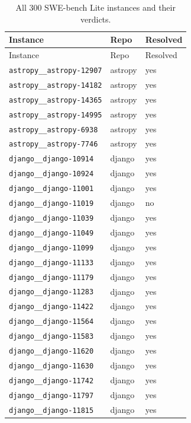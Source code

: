 \begin{longtable}{@{}p{}lp{}@{}}
\caption{All 300 SWE-bench Lite instances and their verdicts.}\label{tab:instances}\\
\toprule
Instance & Repo & Resolved \\
\midrule
\endfirsthead
\toprule Instance & Repo & Resolved \\ \midrule \endhead
\bottomrule \endfoot
\texttt{astropy\_\_astropy-12907} & astropy & yes \\
\texttt{astropy\_\_astropy-14182} & astropy & yes \\
\texttt{astropy\_\_astropy-14365} & astropy & yes \\
\texttt{astropy\_\_astropy-14995} & astropy & yes \\
\texttt{astropy\_\_astropy-6938} & astropy & yes \\
\texttt{astropy\_\_astropy-7746} & astropy & yes \\
\texttt{django\_\_django-10914} & django & yes \\
\texttt{django\_\_django-10924} & django & yes \\
\texttt{django\_\_django-11001} & django & yes \\
\texttt{django\_\_django-11019} & django & no \\
\texttt{django\_\_django-11039} & django & yes \\
\texttt{django\_\_django-11049} & django & yes \\
\texttt{django\_\_django-11099} & django & yes \\
\texttt{django\_\_django-11133} & django & yes \\
\texttt{django\_\_django-11179} & django & yes \\
\texttt{django\_\_django-11283} & django & yes \\
\texttt{django\_\_django-11422} & django & yes \\
\texttt{django\_\_django-11564} & django & yes \\
\texttt{django\_\_django-11583} & django & yes \\
\texttt{django\_\_django-11620} & django & yes \\
\texttt{django\_\_django-11630} & django & yes \\
\texttt{django\_\_django-11742} & django & yes \\
\texttt{django\_\_django-11797} & django & yes \\
\texttt{django\_\_django-11815} & django & yes \\

\end{longtable}

